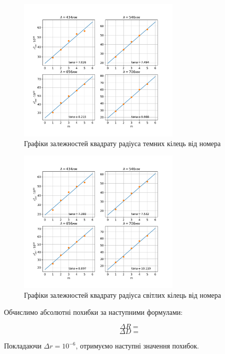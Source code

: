 \begin{figure}[h!]    
    \centering
    \includegraphics[width=0.7\textwidth]{assets/r_dark(m).pdf}
    \caption{Графіки залежностей квадрату радіуса темних кілець від номера}
\end{figure}
\begin{figure}[h!]
    \centering
    \includegraphics[width=0.7\textwidth]{assets/r_light(m).pdf}
    \caption{Графіки залежностей квадрату радіуса світлих кілець від номера}
\end{figure}

\pagebreak
Обчислимо абсолютні похибки за наступними формулами:

$$ \Delta R = $$
$$ \Delta D = $$

Покладаючи $\Delta r = 10^{-6}$, отримуємо наступні значення похибок.

